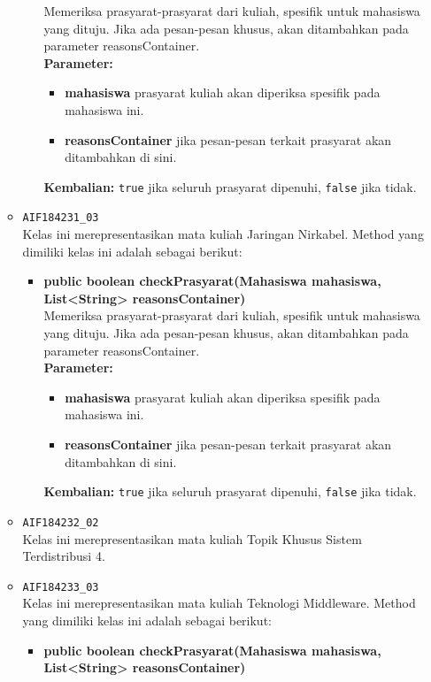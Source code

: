 \begin{enumerate}
\begin{itemize}
\begin{itemize}
			Memeriksa prasyarat-prasyarat dari kuliah, spesifik untuk mahasiswa yang dituju. Jika ada pesan-pesan khusus, akan ditambahkan pada parameter reasonsContainer.\\
			\textbf{Parameter:}
			\begin{itemize}
				\item \textbf{mahasiswa} prasyarat kuliah akan diperiksa spesifik pada mahasiswa ini.
				\item \textbf{reasonsContainer} jika pesan-pesan terkait prasyarat akan ditambahkan di sini.
			\end{itemize}
			\textbf{Kembalian:} \texttt{true} jika seluruh prasyarat dipenuhi, \texttt{false} jika tidak.
		\end{itemize}
		\item \texttt{AIF184231\_03} \\
		Kelas ini merepresentasikan mata kuliah Jaringan Nirkabel. Method yang dimiliki kelas ini adalah sebagai berikut: 
		\begin{itemize}
			\item \textbf{public boolean checkPrasyarat(Mahasiswa mahasiswa, List<String> reasonsContainer)}\\
			Memeriksa prasyarat-prasyarat dari kuliah, spesifik untuk mahasiswa yang dituju. Jika ada pesan-pesan khusus, akan ditambahkan pada parameter reasonsContainer.\\
			\textbf{Parameter:}
			\begin{itemize}
				\item \textbf{mahasiswa} prasyarat kuliah akan diperiksa spesifik pada mahasiswa ini.
				\item \textbf{reasonsContainer} jika pesan-pesan terkait prasyarat akan ditambahkan di sini.
			\end{itemize}
			\textbf{Kembalian:} \texttt{true} jika seluruh prasyarat dipenuhi, \texttt{false} jika tidak.
		\end{itemize}
		\item \texttt{AIF184232\_02} \\
		Kelas ini merepresentasikan mata kuliah Topik Khusus Sistem Terdistribusi 4.
		\item \texttt{AIF184233\_03} \\
		Kelas ini merepresentasikan mata kuliah Teknologi Middleware. Method yang dimiliki kelas ini adalah sebagai berikut: 
		\begin{itemize}
			\item \textbf{public boolean checkPrasyarat(Mahasiswa mahasiswa, List<String> reasonsContainer)}\\

\end{itemize}
\end{itemize}
\end{enumerate}
